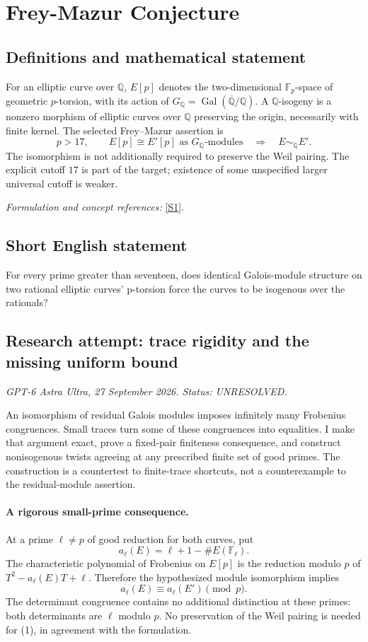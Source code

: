 \documentclass[11pt]{article}
\begin{document}
\section*{\texorpdfstring{Frey-Mazur Conjecture}{Frey-Mazur Conjecture}}\label{statement}
\subsection{Definitions and mathematical statement}
For an elliptic curve over ${\mathbb{Q}}$, $E[p]$ denotes the two-dimensional ${\mathbb{F}}_p$-space of geometric $p$-torsion, with its action of $G_{{\mathbb{Q}}}=\operatorname{Gal}(\overline{{\mathbb{Q}}}/{\mathbb{Q}})$. A ${\mathbb{Q}}$-isogeny is a nonzero morphism of elliptic curves over ${\mathbb{Q}}$ preserving the origin, necessarily with finite kernel. The selected Frey--Mazur assertion is
\[
 p>17,\qquad E[p]\cong E'[p]\text{ as }G_{{\mathbb{Q}}}\text{-modules}
 \quad\Longrightarrow\quad E\sim_{{\mathbb{Q}}}E'.
\]
The isomorphism is not additionally required to preserve the Weil pairing. The explicit cutoff $17$ is part of the target; existence of some unspecified larger universal cutoff is weaker.
\par\smallskip\textit{Formulation and concept references:} \href{https://annals.math.princeton.edu/2016/184-3/p02}{[S1]}.

\subsection{Short English statement}
For every prime greater than seventeen, does identical Galois-module structure on two rational elliptic curves' p-torsion force the curves to be isogenous over the rationals?
\subsection{Research attempt: trace rigidity and the missing uniform bound}
\textit{GPT-6 Astra Ultra, 27 September 2026. Status: UNRESOLVED.}

An isomorphism of residual Galois modules imposes infinitely many Frobenius congruences. Small traces turn some of these congruences into equalities. I make that argument exact, prove a fixed-pair finiteness consequence, and construct nonisogenous twists agreeing at any prescribed finite set of good primes. The construction is a countertest to finite-trace shortcuts, not a counterexample to the residual-module assertion.

\paragraph{A rigorous small-prime consequence.}
At a prime $\ell\ne p$ of good reduction for both curves, put
\[
 a_\ell(E)=\ell+1-\#E(\mathbb F_\ell).
\]
The characteristic polynomial of Frobenius on $E[p]$ is the reduction modulo $p$ of $T^2-a_\ell(E)T+\ell$. Therefore the hypothesized module isomorphism implies
\[
 a_\ell(E)\equiv a_\ell(E')\pmod p.                        \tag{1}
\]
The determinant congruence contains no additional distinction at these primes: both determinants are $\ell$ modulo $p$. No preservation of the Weil pairing is needed for (1), in agreement with the formulation.
\end{document}
